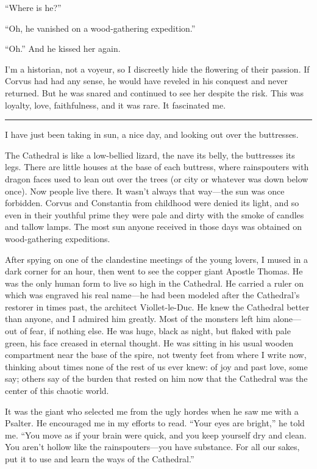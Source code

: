 ``Where is he?''

``Oh, he vanished on a wood-gathering expedition.''

``Oh.'' And he kissed her again.

I'm a historian, not a voyeur, so I discreetly hide the flowering of their passion. If Corvus had had any sense, he would have reveled in his conquest and never returned. But he was snared and continued to see her despite the risk. This was loyalty, love, faithfulness, and it was rare. It fascinated me.

\fancybreak{* * *}

I have just been taking in sun, a nice day, and looking out over the buttresses.

The Cathedral is like a low-bellied lizard, the nave its belly, the buttresses its legs. There are little houses at the base of each buttress, where rainspouters with dragon faces used to lean out over the trees (or city or whatever was down below once). Now people live there. It wasn't always that way—the sun was once forbidden. Corvus and Constantia from childhood were denied its light, and so even in their youthful prime they were pale and dirty with the smoke of candles and tallow lamps. The most sun anyone received in those days was obtained on wood-gathering expeditions.

After spying on one of the clandestine meetings of the young lovers, I mused in a dark corner for an hour, then went to see the copper giant Apostle Thomas. He was the only human form to live so high in the Cathedral. He carried a ruler on which was engraved his real name—he had been modeled after the Cathedral's restorer in times past, the architect Viollet-le-Duc. He knew the Cathedral better than anyone, and I admired him greatly. Most of the monsters left him alone—out of fear, if nothing else. He was huge, black as night, but flaked with pale green, his face creased in eternal thought. He was sitting in his usual wooden compartment near the base of the spire, not twenty feet from where I write now, thinking about times none of the rest of us ever knew: of joy and past love, some say; others say of the burden that rested on him now that the Cathedral was the center of this chaotic world.

It was the giant who selected me from the ugly hordes when he saw me with a Psalter. He encouraged me in my efforts to read. ``Your eyes are bright,'' he told me. ``You move as if your brain were quick, and you keep yourself dry and clean. You aren't hollow like the rainspouters—you have substance. For all our sakes, put it to use and learn the ways of the Cathedral.''

